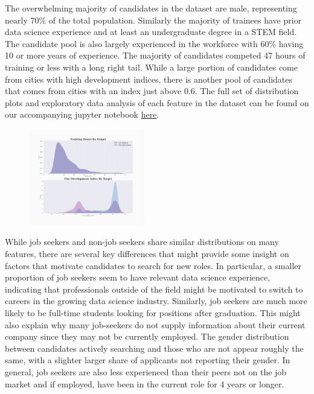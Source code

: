 

\vspace{10px}
The overwhelming majority of candidates in the dataset are male, representing nearly 70\% of the total population. Similarly the majority of trainees have prior data science experience and at least an undergraduate degree in a STEM field.  The candidate pool is also largely experienced in the workforce with 60\% having 10 or more years of experience. The majority of candidates competed 47 hours of training or less with a long right tail.  While a large portion of candidates come from cities with high development indices, there is another pool of candidates that comes from cities with an index just above 0.6. The full set of distribution plots and exploratory data analysis of each feature in the dataset can be found on our accompanying jupyter notebook \href{https://github.com/cas2247/RDS_Algorithmic_Fairness/blob/main/notebooks/1_Input_and_Output.ipynb}{here}.


\begin{figure}
    \centering
    \includegraphics[width=0.45\textwidth]{continuous_distributions_target}
\end{figure}

While job seekers and non-job seekers share similar distributions on many features, there are several key differences that might provide some insight on factors that motivate candidates to search for new roles.  In particular, a smaller proportion of job seekers seem to have relevant data science experience, indicating that professionals outside of the field might be motivated to switch to careers in the growing data science industry.  Similarly, job seekers are much more likely to be full-time students looking for positions after graduation.  This might also explain why many job-seekers do not supply information about their current company since they may not be currently employed. The gender distribution between candidates actively searching and those who are not appear roughly the same, with a slighter larger share of applicants not reporting their gender.  In general, job seekers are also less experienced than their peers not on the job market and if employed, have been in the current role for 4 years or longer. 

